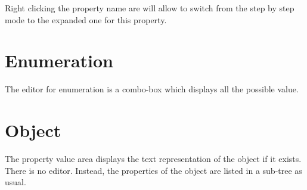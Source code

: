 \documentclass[a4paper, twoside]{report}
\begin{document}
Right clicking the property name are will allow to switch from the step by step mode to the
expanded one for this property.

\section{Enumeration}

The editor for enumeration is a combo-box which displays all the possible value.

\section{Object}

The property value area displays the text representation of the object if it exists.
There is no editor. Instead, the properties of the object are listed in a sub-tree as usual.
\end{document}
